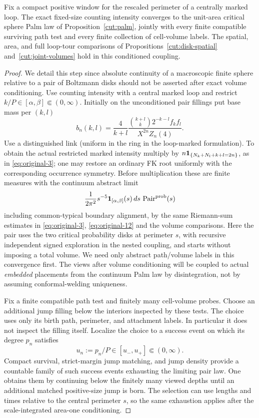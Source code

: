 \begin{proposition}\label{cut:fixed-volume}
Fix a compact positive window for the rescaled perimeter of a centrally
marked loop.  The exact fixed-size counting intensity converges to the
unit-area critical sphere Palm law of Proposition~\ref{cut:palm}, jointly
with every finite compatible surviving path test and every finite collection
of cell-volume labels.  The spatial, area, and full loop-tour comparisons of
Propositions~\ref{cut:disk-spatial} and~\ref{cut:joint-volumes} hold in this
conditioned coupling.
\end{proposition}
\begin{proof}\leavevmode

We detail this step since absolute continuity of a macroscopic finite sphere relative to a pair of Boltzmann disks should not be asserted after exact volume conditioning. Use counting intensity with a central marked loop and restrict \(k/P\in[\alpha,\beta]\Subset(0,\infty)\). Initially on the unconditioned pair fillings put base mass per \((k,l)\)
\[
 b_n(k,l)=\frac{4}{k+l}
 \frac{\binom{k+l}k 2^{-k-l} f_k f_l}{X^{2n}Z_n(4)} .
\]
Use a distinguished link (uniform in the ring in the loop-marked formulation). To obtain the actual restricted marked intensity multiply by \(n{\bf1}_{\{N_k+N_l+k+l=2n\}}\), as in \eqref{eq:original-3}; one may restore an ordinary FK root uniformly with the corresponding occurrence symmetry. Before multiplication these are finite measures with the continuum abstract limit
\[
 \frac{1}{2\pi^2}s^{-5}{\bf1}_{[\alpha,\beta]}(s)\,ds\ 
        \mathrm{Pair}^{\rm prob}(s)
\]
including common-typical boundary alignment, by the same Riemann-sum estimates in \eqref{eq:original-3}, \eqref{eq:original-12} and the volume comparisons.
Here the pair uses the two critical probability disks at perimeter \(s\), with recursive independent signed exploration in the nested coupling, and starts without imposing a total volume.
We need only abstract path/volume labels in this convergence first.
The views after volume conditioning will be coupled to actual \emph{embedded} placements from the continuum Palm law by disintegration, not by assuming conformal-welding uniqueness.


Fix a finite compatible path test and finitely many cell-volume probes.
Choose an additional jump filling below the interiors inspected by these
tests.  The choice uses only its birth path, perimeter, and attachment
labels.  In particular it does not inspect the filling itself.  Localize
the choice to a success event on which its degree $p_n$ satisfies
\[
 u_n:=p_n/P\in[u_-,u_+]\Subset(0,\infty).
\]
Compact survival, strict-margin jump matching, and jump density provide a
countable family of such success events exhausting the limiting pair law.
One obtains them by continuing below the finitely many viewed depths until
an additional matched positive-size jump is born.  The selection can use
lengths and times relative to the central perimeter $s$, so the same
exhaustion applies after the scale-integrated area-one conditioning.


\end{proof}
